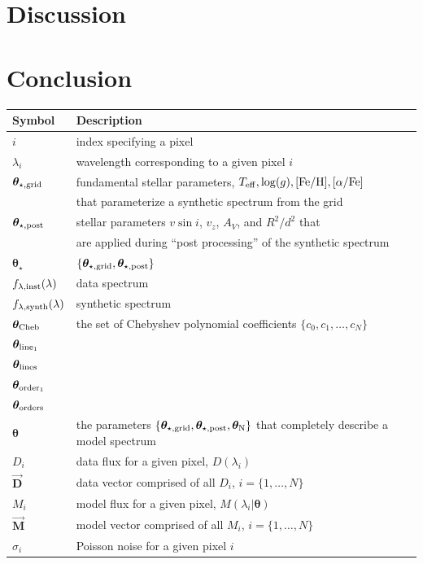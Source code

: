 \documentclass[iop,floatfix]{emulateapj}
\newcommand{\vt}{ {\bm \theta}}
\newcommand{\vg}{\vt_{\star, {\rm grid}}}
\newcommand{\vpp}{\vt_{\star, {\rm post}}}
\newcommand{\finst}{f_{\lambda, {\rm inst}}}
\newcommand{\fsynth}{f_{\lambda, {\rm synth}}}
\newcommand{\vN}{\vt_{\rm N}}
\newcommand{\vtstar}{\vt_{\star}}
\newcommand{\vtcheb}{\vt_{\rm Cheb}}
\newcommand{\vtorder}[1]{\vt_{{\rm order}_{#1}}}
\newcommand{\vtorders}{\vt_{\rm orders}}
\newcommand{\vtline}[1]{\vt_{{\rm line}_{#1}}}
\newcommand{\vtlines}{\vt_{\rm lines}}
\newcommand{\fM}{ \vec{{\bm M}}}
\newcommand{\fMi}{M_i}
\newcommand{\fD}{ \vec{{\bm D}}}
\newcommand{\fDi}{D_i}
\newcommand{\Z}{[{\rm Fe}/{\rm H}]}
\newcommand{\A}{[\alpha/{\rm Fe}]}
\begin{document}
\section{Discussion \label{sec:discussion}}

\section{Conclusion \label{sec:conclusion}}




\appendix

\begin{table}[!htb]
\begin{tabular}{ll}
\hline
\hline
Symbol & Description\\
\hline
\hline
$i$ & index specifying a pixel\\
$\lambda_i$ & wavelength corresponding to a given pixel $i$\\
$\vg$ & fundamental stellar parameters, $T_{\rm eff}, \log(g), \Z, \A$\\
  & that parameterize a synthetic spectrum from the grid\\
$\vpp$ & stellar parameters $v \sin i$, $v_z$, $A_V$, and $R^2/d^2$ that\\
  & are applied during ``post processing'' of the synthetic spectrum\\
$\vtstar$ & $\{\vg,\vpp \}$\\
$\finst(\lambda)$ & data spectrum\\
$\fsynth(\lambda)$ & synthetic spectrum\\
$\vtcheb$ & the set of Chebyshev polynomial coefficients $\{c_0, c_1, \ldots, c_N\}$\\
$\vtline{1}$ & \\
$\vtlines$ & \\
$\vtorder{1}$ & \\
$\vtorders$ & \\
$\vt$ & the parameters $\{\vg, \vpp, \vN\}$ that completely describe a model spectrum\\
$\fDi$ & data flux for a given pixel, $D(\lambda_i)$\\
$\fD$ & data vector comprised of all $\fDi$, $i = \{1, \ldots, N\}$\\
$\fMi$ & model flux for a given pixel, $M(\lambda_i | \vt)$\\
$\fM$ & model vector comprised of all $\fMi$, $i = \{1, \ldots, N\}$\\
$\sigma_i$ & Poisson noise for a given pixel $i$\\

\end{tabular}
\end{table}
\end{document}
